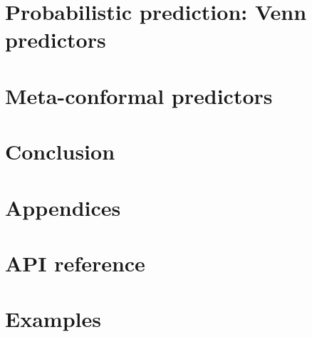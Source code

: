 \documentclass[twoside,11pt]{article}
\begin{document}
\section{Probabilistic prediction: Venn predictors}

\section{Meta-conformal predictors}

\section{Conclusion}

\renewcommand{\appendixpagename}{}
\begin{appendices}
  \section*{Appendices}

  \section{API reference}
  \label{appendix:a}

  \section{Examples}
  \label{appendix:b}

\end{appendices}


\end{document}
